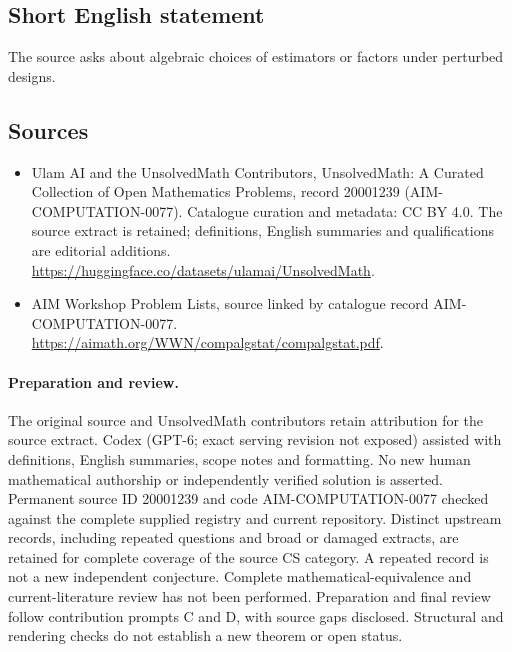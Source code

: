 \documentclass[11pt]{article}
\begin{document}
\subsection{Short English statement}
The source asks about algebraic choices of estimators or factors under perturbed designs.
\subsection{Sources}
\begin{itemize}
\item[\hypertarget{source:20001239:1}{S1}] Ulam AI and the UnsolvedMath Contributors, UnsolvedMath: A Curated Collection of Open Mathematics Problems, record 20001239 (AIM-COMPUTATION-0077). Catalogue curation and metadata: CC BY 4.0. The source extract is retained; definitions, English summaries and qualifications are editorial additions.
\url{https://huggingface.co/datasets/ulamai/UnsolvedMath}.
\item[\hypertarget{source:20001239:2}{S2}] AIM Workshop Problem Lists, source linked by catalogue record AIM-COMPUTATION-0077.
\url{https://aimath.org/WWN/compalgstat/compalgstat.pdf}.
\end{itemize}
\paragraph{Preparation and review.}
The original source and UnsolvedMath contributors retain attribution for the source extract. Codex (GPT-6; exact serving revision not exposed) assisted with definitions, English summaries, scope notes and formatting. No new human mathematical authorship or independently verified solution is asserted. Permanent source ID 20001239 and code AIM-COMPUTATION-0077 checked against the complete supplied registry and current repository. Distinct upstream records, including repeated questions and broad or damaged extracts, are retained for complete coverage of the source CS category. A repeated record is not a new independent conjecture. Complete mathematical-equivalence and current-literature review has not been performed. Preparation and final review follow contribution prompts C and D, with source gaps disclosed. Structural and rendering checks do not establish a new theorem or open status.
\label{end:20001239}
\end{document}
